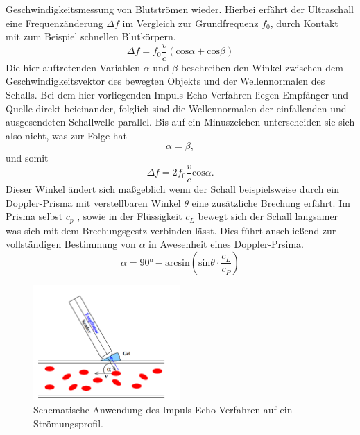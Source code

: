 Geschwindigkeitsmessung von Blutströmen wieder. Hierbei erfährt der Ultraschall eine Frequenzänderung $\Delta f$ im Vergleich zur Grundfrequenz $f_0$,
durch Kontakt mit zum Beispiel schnellen Blutkörpern. 
\begin{equation*}
  \Delta f = f_0 \frac{v}{c} \left ( \text{cos}\alpha + \text{cos}\beta \right )
\end{equation*}
Die hier auftretenden Variablen $\alpha$ und $\beta$ beschreiben den Winkel zwischen dem Geschwindigkeitsvektor des bewegten Objekts
und der Wellennormalen des Schalls. Bei dem hier vorliegenden Impuls-Echo-Verfahren liegen Empfänger und Quelle direkt beieinander, folglich sind 
die Wellennormalen der einfallenden und ausgesendeten Schallwelle parallel. Bis auf ein Minuszeichen unterscheiden sie sich also nicht, was zur Folge hat
\begin{equation*}
    \alpha = \beta,
\end{equation*}
und somit
\begin{equation}
    \label{eqn:deltaf}
    \Delta f = 2 f_0 \frac{v}{c} \text{cos}\alpha.
\end{equation}
Dieser Winkel ändert sich maßgeblich wenn der Schall beispielsweise durch ein Doppler-Prisma mit verstellbaren Winkel $\theta$ eine zusätzliche Brechung erfährt.
Im Prisma selbst $c_p$ \cite{skript}, sowie in der Flüssigkeit $c_L$ \cite{skript} bewegt sich der Schall langsamer was sich mit dem Brechungsgestz verbinden lässt. Dies 
führt anschließend zur vollständigen Bestimmung von $\alpha$ in Awesenheit eines Doppler-Prsima. 
\begin{equation}
    \label{eqn:alphafinal}
    \alpha = 90 \si{\degree} - \text{arcsin} \left( \text{sin}\theta \cdot \frac{c_L}{c_P} \right)
\end{equation}

\begin{figure}
    \centering
    \includegraphics[width=0.5\textwidth]{bilder/winkel.png}
    \caption{Schematische Anwendung des Impuls-Echo-Verfahren auf ein Strömungsprofil. \cite{skript}} 
    \label{fig:figskizze1}
\end{figure}


